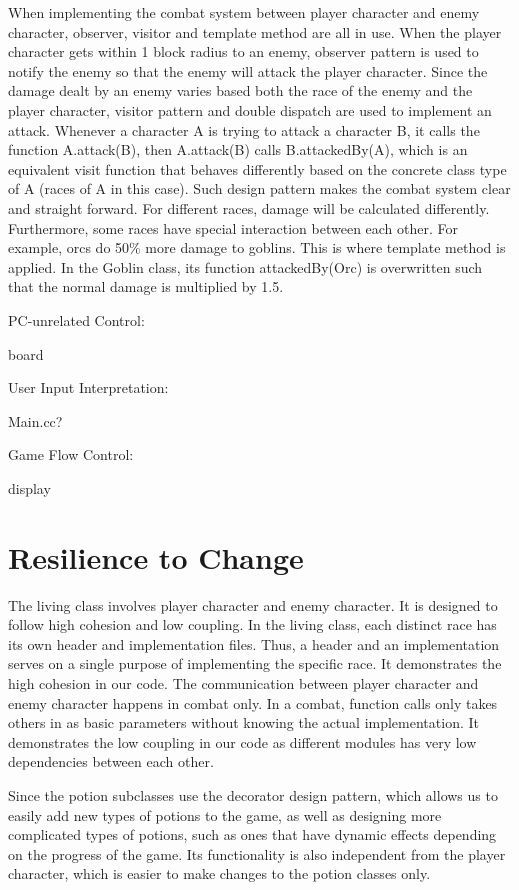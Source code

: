 \documentclass[11pt]{article}
\theoremstyle{plain} \newtheorem{theorem*}{Theorem}[subsection]
\begin{document}
When implementing the combat system between player character and enemy
character, observer, visitor and template method are all in use. When the
player character gets within 1 block radius to an enemy, observer pattern is
used to notify the enemy so that the enemy will attack the player character.
Since the damage dealt by an enemy varies based both the race of the enemy and
the player character, visitor pattern and double dispatch are used to implement
an attack. Whenever a character A is trying to attack a character B, it calls
the function A.attack(B), then A.attack(B) calls B.attackedBy(A), which is an
equivalent visit function that behaves differently based on the concrete class
type of A (races of A in this case). Such design pattern makes the combat
system clear and straight forward. For different races, damage will be
calculated differently. Furthermore, some races have special interaction
between each other. For example, orcs do 50\% more damage to goblins. This is
where template method is applied. In the Goblin class, its function
attackedBy(Orc) is overwritten such that the normal damage is multiplied by
1.5. 

PC-unrelated Control: 

board 

User Input Interpretation: 

Main.cc? 

Game Flow Control: 

display 


\section{Resilience to Change}

The living class involves player character and enemy character. It is designed
to follow high cohesion and low coupling. In the living class, each distinct
race has its own header and implementation files. Thus, a header and an
implementation serves on a single purpose of implementing the specific race. It
demonstrates the high cohesion in our code. The communication between player
character and enemy character happens in combat only. In a combat, function
calls only takes others in as basic parameters without knowing the actual
implementation. It demonstrates the low coupling in our code as different
modules has very low dependencies between each other. 

Since the potion subclasses use the decorator design pattern, which allows us
to easily add new types of potions to the game, as well as designing more
complicated types of potions, such as ones that have dynamic effects depending
on the progress of the game. Its functionality is also independent from the
player character, which is easier to make changes to the potion classes only. 
\end{document}
